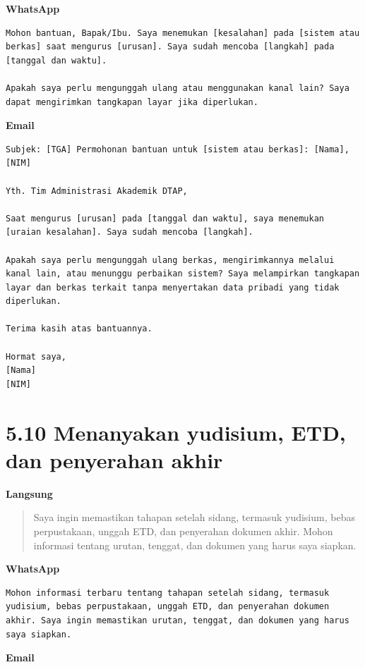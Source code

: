 \documentclass[
  indonesian,
]{article}
\renewcommand{\subsection}{\section}
\begin{document}
\textbf{WhatsApp}

\begin{verbatim}
Mohon bantuan, Bapak/Ibu. Saya menemukan [kesalahan] pada [sistem atau berkas] saat mengurus [urusan]. Saya sudah mencoba [langkah] pada [tanggal dan waktu].

Apakah saya perlu mengunggah ulang atau menggunakan kanal lain? Saya dapat mengirimkan tangkapan layar jika diperlukan.
\end{verbatim}

\textbf{Email}

\begin{verbatim}
Subjek: [TGA] Permohonan bantuan untuk [sistem atau berkas]: [Nama], [NIM]

Yth. Tim Administrasi Akademik DTAP,

Saat mengurus [urusan] pada [tanggal dan waktu], saya menemukan [uraian kesalahan]. Saya sudah mencoba [langkah].

Apakah saya perlu mengunggah ulang berkas, mengirimkannya melalui kanal lain, atau menunggu perbaikan sistem? Saya melampirkan tangkapan layar dan berkas terkait tanpa menyertakan data pribadi yang tidak diperlukan.

Terima kasih atas bantuannya.

Hormat saya,
[Nama]
[NIM]
\end{verbatim}

\subsection{5.10 Menanyakan yudisium, ETD, dan penyerahan
akhir}\label{menanyakan-yudisium-etd-dan-penyerahan-akhir}

\textbf{Langsung}

\begin{quote}
Saya ingin memastikan tahapan setelah sidang, termasuk yudisium, bebas
perpustakaan, unggah ETD, dan penyerahan dokumen akhir. Mohon informasi
tentang urutan, tenggat, dan dokumen yang harus saya siapkan.
\end{quote}

\textbf{WhatsApp}

\begin{verbatim}
Mohon informasi terbaru tentang tahapan setelah sidang, termasuk yudisium, bebas perpustakaan, unggah ETD, dan penyerahan dokumen akhir. Saya ingin memastikan urutan, tenggat, dan dokumen yang harus saya siapkan.
\end{verbatim}

\textbf{Email}
\end{document}
